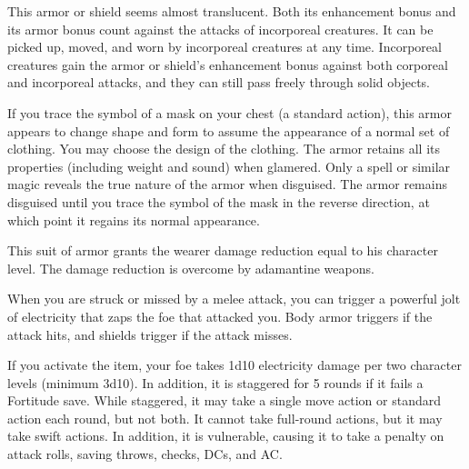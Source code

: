  This armor or shield seems almost translucent. Both its enhancement bonus and its armor bonus count against the attacks of incorporeal creatures. It can be picked up, moved, and worn by incorporeal creatures at any time. Incorporeal creatures gain the armor or shield's enhancement bonus against both corporeal and incorporeal attacks, and they can still pass freely through solid objects.


 If you trace the symbol of a mask on your chest (a standard action), this armor appears to change shape and form to assume the appearance of a normal set of clothing. You may choose the design of the clothing. The armor retains all its properties (including weight and sound) when glamered. Only a  spell or similar magic reveals the true nature of the armor when disguised. The armor remains disguised until you trace the symbol of the mask in the reverse direction, at which point it regains its normal appearance. 


 This suit of armor grants the wearer damage reduction equal to his character level. The damage reduction is overcome by adamantine weapons.


 When you are struck or missed by a melee attack, you can trigger a powerful jolt of electricity that zaps the foe that attacked you. Body armor triggers if the attack hits, and shields trigger if the attack misses.

If you activate the item, your foe takes 1d10 electricity damage per two character levels (minimum 3d10). In addition, it is staggered for 5 rounds if it fails a Fortitude save. While staggered, it may take a single move action or standard action each round, but not both. It cannot take full-round actions, but it may take swift actions. In addition, it is vulnerable, causing it to take a  penalty on attack rolls, saving throws, checks, DCs, and AC.

